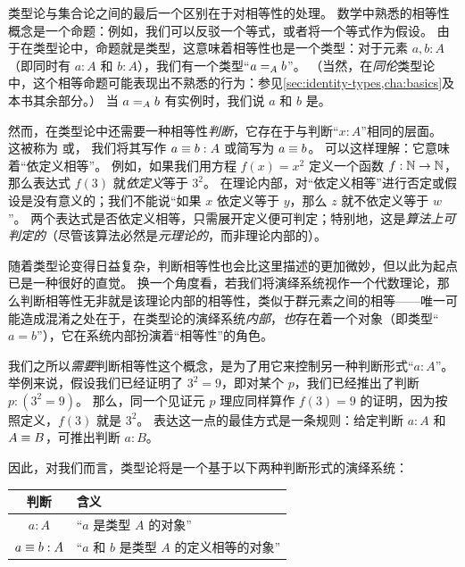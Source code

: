 类型论与集合论之间的最后一个区别在于对相等性的处理。
数学中熟悉的相等性概念是一个命题：例如，我们可以反驳一个等式，或者将一个等式作为假设。
由于在类型论中，命题就是类型，这意味着相等性也是一个类型：对于元素 $a,b:A$（即同时有 $a:A$ 和 $b:A$），我们有一个类型“$\id[A]ab$”。
（当然，在\emph{同伦}类型论中，这个相等命题可能表现出不熟悉的行为：参见\cref{sec:identity-types,cha:basics}及本书其余部分。）
当 $\id[A]ab$ 有实例时，我们说 $a$ 和 $b$ 是。
%
%

然而，在类型论中还需要一种相等性\emph{判断}，它存在于与判断“$x:A$”相同的层面。
%
这被称为
%
%
或，
%
%
我们将其写作 $a\jdeq b : A$ 或简写为 $a \jdeq b$。
可以这样理解：它意味着“依定义相等”。
例如，如果我们用方程 $f(x)=x^2$ 定义一个函数 $f:\nat\to\nat$，那么表达式 $f(3)$ 就\emph{依定义}等于 $3^2$。
在理论内部，对“依定义相等”进行否定或假设是没有意义的；我们不能说“如果 $x$ 依定义等于 $y$，那么 $z$ 就不依定义等于 $w$”。
两个表达式是否依定义相等，只需展开定义便可判定；特别地，这是\emph{算法上可判定的}（尽管该算法必然是\emph{元理论的}，而非理论内部的）。

随着类型论变得日益复杂，判断相等性也会比这里描述的更加微妙，但以此为起点已是一种很好的直觉。
换一个角度看，若我们将演绎系统视作一个代数理论，那么判断相等性无非就是该理论内部的相等性，类似于群元素之间的相等——唯一可能造成混淆之处在于，在类型论的演绎系统\emph{内部}，\emph{也}存在着一个对象（即类型``$a=b$''），它在系统内部扮演着``相等性''的角色。

我们之所以\emph{需要}判断相等性这个概念，是为了用它来控制另一种判断形式``$a:A$''。
举例来说，假设我们已经证明了 $3^2=9$，即对某个 $p$，我们已经推出了判断 $p:(3^2=9)$。
那么，同一个见证元 $p$ 理应同样算作 $f(3)=9$ 的证明，因为按照定义，$f(3)$ 就是 $3^2$。
表达这一点的最佳方式是一条规则：给定判断 $a:A$ 和 $A\jdeq B$，可推出判断 $a:B$。

因此，对我们而言，类型论将是一个基于以下两种判断形式的演绎系统：


\begin{center}
\medskip
\begin{tabular}{cl}
  \toprule
  判断 & 含义\\
  \midrule
  $a : A$       & ``$a$ 是类型 $A$ 的对象''\\
  $a \jdeq b : A$ & ``$a$ 和 $b$ 是类型 $A$ 的定义相等的对象''\\
  \bottomrule
\end{tabular}
\medskip
\end{center}


